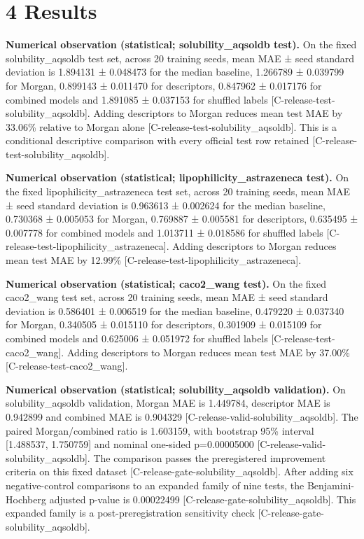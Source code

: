 \documentclass[10pt,twocolumn]{article}
\begin{document}
\section{4 Results}

\textbf{Numerical observation (statistical; solubility_aqsoldb test).} On the fixed solubility_aqsoldb test set, across 20 training seeds, mean MAE ± seed standard deviation is 1.894131 ± 0.048473 for the median baseline, 1.266789 ± 0.039799 for Morgan, 0.899143 ± 0.011470 for descriptors, 0.847962 ± 0.017176 for combined models and 1.891085 ± 0.037153 for shuffled labels {\scriptsize[C-release-test-solubility\_aqsoldb]}. Adding descriptors to Morgan reduces mean test MAE by 33.06\% relative to Morgan alone {\scriptsize[C-release-test-solubility\_aqsoldb]}. This is a conditional descriptive comparison with every official test row retained {\scriptsize[C-release-test-solubility\_aqsoldb]}.

\textbf{Numerical observation (statistical; lipophilicity_astrazeneca test).} On the fixed lipophilicity_astrazeneca test set, across 20 training seeds, mean MAE ± seed standard deviation is 0.963613 ± 0.002624 for the median baseline, 0.730368 ± 0.005053 for Morgan, 0.769887 ± 0.005581 for descriptors, 0.635495 ± 0.007778 for combined models and 1.013711 ± 0.018586 for shuffled labels {\scriptsize[C-release-test-lipophilicity\_astrazeneca]}. Adding descriptors to Morgan reduces mean test MAE by 12.99\% {\scriptsize[C-release-test-lipophilicity\_astrazeneca]}.

\textbf{Numerical observation (statistical; caco2_wang test).} On the fixed caco2_wang test set, across 20 training seeds, mean MAE ± seed standard deviation is 0.586401 ± 0.006519 for the median baseline, 0.479220 ± 0.037340 for Morgan, 0.340505 ± 0.015110 for descriptors, 0.301909 ± 0.015109 for combined models and 0.625006 ± 0.051972 for shuffled labels {\scriptsize[C-release-test-caco2\_wang]}. Adding descriptors to Morgan reduces mean test MAE by 37.00\% {\scriptsize[C-release-test-caco2\_wang]}.

\textbf{Numerical observation (statistical; solubility_aqsoldb validation).} On solubility_aqsoldb validation, Morgan MAE is 1.449784, descriptor MAE is 0.942899 and combined MAE is 0.904329 {\scriptsize[C-release-valid-solubility\_aqsoldb]}. The paired Morgan/combined ratio is 1.603159, with bootstrap 95\% interval [1.488537, 1.750759] and nominal one-sided p=0.00005000 {\scriptsize[C-release-valid-solubility\_aqsoldb]}. The comparison passes the preregistered improvement criteria on this fixed dataset {\scriptsize[C-release-gate-solubility\_aqsoldb]}. After adding six negative-control comparisons to an expanded family of nine tests, the Benjamini-Hochberg adjusted p-value is 0.00022499 {\scriptsize[C-release-gate-solubility\_aqsoldb]}. This expanded family is a post-preregistration sensitivity check {\scriptsize[C-release-gate-solubility\_aqsoldb]}.
\end{document}
